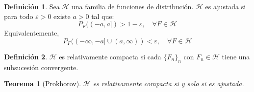 \documentclass{report}
\newtheorem{theorem}{Teorema}[chapter]
\theoremstyle{remark}
\theoremstyle{remark}
\theoremstyle{remark}
\theoremstyle{definition}
\newtheorem{definition}{Definición}[chapter]
\theoremstyle{definition}
\theoremstyle{definition}
\theoremstyle{definition}
\begin{document}
\begin{definition}
    Sea $\mathcal{H}$ una familia de funciones de distribución.
    $\mathcal{H}$ es ajustada si para todo $\varepsilon>0$ existe $a>0$ tal que:
    $$P_F((-a,a]) > 1-\varepsilon, \quad \forall F \in \mathcal{H}$$
    Equivalentemente,
    $$P_F((-\infty,-a] \cup (a,\infty)) < \varepsilon, \quad \forall F \in \mathcal{H}$$
\end{definition}

\begin{definition}
    $\mathcal{H}$ es relativamente compacta si cada $\{F_n\}_n$ con $F_n \in \mathcal{H}$ tiene una subsucesión convergente.
\end{definition}

\begin{theorem}[Prokhorov]
    $\mathcal{H}$ es relativamente compacta si y solo si es ajustada.
\end{theorem}
\end{document}
